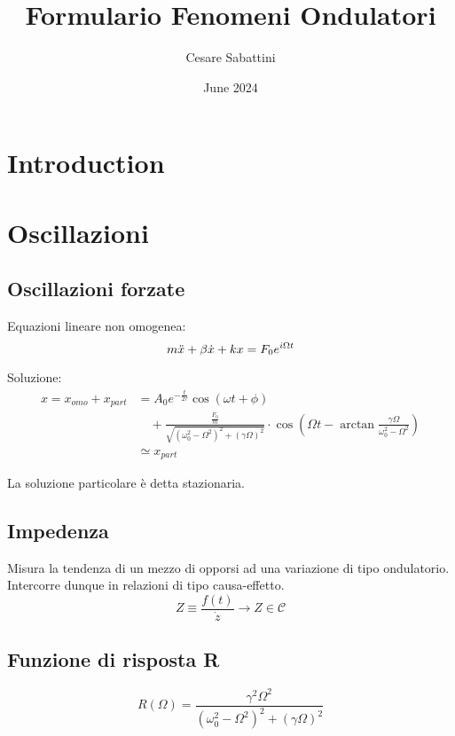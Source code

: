 \documentclass{article}
\title{Formulario Fenomeni Ondulatori}
\author{Cesare Sabattini}
\date{June 2024}
\begin{document}
\maketitle

\section{Introduction}


\section{Oscillazioni}
\subsection{Oscillazioni forzate}
Equazioni lineare non omogenea:
\begin{equation}
    m\Ddot{x}+\beta\dot{x}+kx=F_0 e^{i\Omega t}
\end{equation}

Soluzione:
\begin{equation}
    \begin{aligned}
    x = x_{omo} + x_{part} &= A_0 e^{-\frac{t}{2\tau}} \cos\left( \omega t + \phi \right) \\
    &\quad + \frac{\frac{F_0}{m}}{\sqrt{(\omega_0^2 - \Omega^2)^2 + (\gamma \Omega)^2}} 
    \cdot \cos\left( \Omega t - \arctan{\frac{\gamma \Omega}{\omega_0^2 - \Omega^2}} \right) \\
    &\simeq x_{part}
    \end{aligned}
\end{equation}

La soluzione particolare è detta stazionaria.

\subsection{Impedenza}
Misura la tendenza di un mezzo di opporsi ad una variazione di tipo ondulatorio. Intercorre dunque in relazioni di tipo causa-effetto.
\begin{equation}
    Z\equiv\frac{f(t)}{\dot{z}} \rightarrow Z\in \mathcal{C}
\end{equation}

\subsection{Funzione di risposta R}

\begin{equation}
    R(\Omega)=\frac{\gamma^2\Omega^2}{(\omega_0^2-\Omega^2)^2+(\gamma\Omega)^2}
\end{equation}
\end{document}
